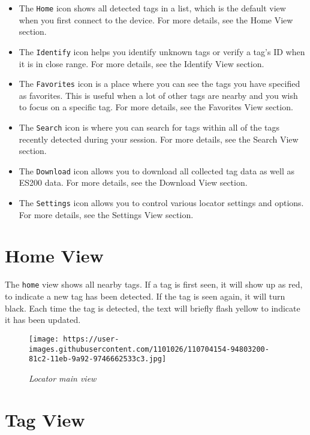 \documentclass[
]{article}
\begin{document}
\begin{itemize}
\item
  The \texttt{Home} icon shows all detected tags in a list, which is the
  default view when you first connect to the device. For more details,
  see the Home View section.
\item
  The \texttt{Identify} icon helps you identify unknown tags or verify a
  tag's ID when it is in close range. For more details, see the Identify
  View section.
\item
  The \texttt{Favorites} icon is a place where you can see the tags you
  have specified as favorites. This is useful when a lot of other tags
  are nearby and you wish to focus on a specific tag. For more details,
  see the Favorites View section.
\item
  The \texttt{Search} icon is where you can search for tags within all
  of the tags recently detected during your session. For more details,
  see the Search View section.
\item
  The \texttt{Download} icon allows you to download all collected tag
  data as well as ES200 data. For more details, see the Download View
  section.
\item
  The \texttt{Settings} icon allows you to control various locator
  settings and options. For more details, see the Settings View section.
\end{itemize}

\hypertarget{home-view}{%
\section{Home View}\label{home-view}}

The \texttt{home} view shows all nearby tags. If a tag is first seen, it
will show up as red, to indicate a new tag has been detected. If the tag
is seen again, it will turn black. Each time the tag is detected, the
text will briefly flash yellow to indicate it has been updated.

\begin{figure}
\centering
\texttt{[image: https://user-images.githubusercontent.com/1101026/110704154-94803200-81c2-11eb-9a92-9746662533c3.jpg]}
\caption{\emph{Locator main view}}
\end{figure}

\hypertarget{tag-view}{%
\section{Tag View}\label{tag-view}}
\end{document}
